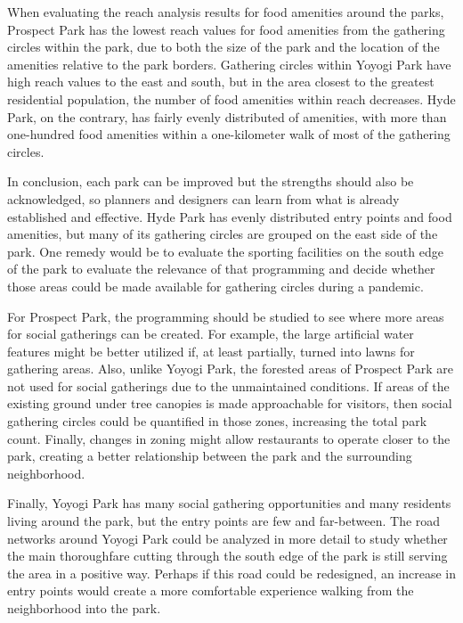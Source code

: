 \begin{multicols}{2}
When evaluating the reach analysis results for food amenities around the parks, Prospect Park has the lowest reach values for food amenities from the gathering circles within the park, due to both the size of the park and the location of the amenities relative to the park borders. Gathering circles within Yoyogi Park have high reach values to the east and south, but in the area closest to the greatest residential population, the number of food amenities within reach decreases. Hyde Park, on the contrary, has fairly evenly distributed of amenities, with more than one-hundred food amenities within a one-kilometer walk of most of the gathering circles. 

In conclusion, each park can be improved but the strengths should also be acknowledged, so planners and designers can learn from what is already established and effective. Hyde Park has evenly distributed entry points and food amenities, but many of its gathering circles are grouped on the east side of the park. One remedy would be to evaluate the sporting facilities on the south edge of the park to evaluate the relevance of that programming and decide whether those areas could be made available for gathering circles during a pandemic. 

For Prospect Park, the programming should be studied to see where more areas for social gatherings can be created. For example, the large artificial water features might be better utilized if, at least partially, turned into lawns for gathering areas. Also, unlike Yoyogi Park, the forested areas of Prospect Park are not used for social gatherings due to the unmaintained conditions. If areas of the existing ground under tree canopies is made approachable for visitors, then social gathering circles could be quantified in those zones, increasing the total park count. Finally, changes in zoning might allow restaurants to operate closer to the park, creating a better relationship between the park and the surrounding neighborhood.

Finally, Yoyogi Park has many social gathering opportunities and many residents living around the park, but the entry points are few and far-between. The road networks around Yoyogi Park could be analyzed in more detail to study whether the main thoroughfare cutting through the south edge of the park is still serving the area in a positive way. Perhaps if this road could be redesigned, an increase in entry points would create a more comfortable experience walking from the neighborhood into the park.


\end{multicols}
